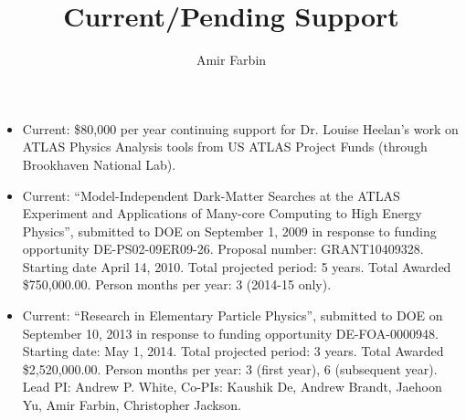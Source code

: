 \documentclass[11pt]{article}
\title{\bf Current/Pending Support} \author{Amir Farbin}
\date{\vspace{-5ex}}
\begin{document}
\maketitle
\begin{itemize}
\item Current: \$80,000 per year continuing support for Dr. Louise Heelan's work on ATLAS Physics Analysis tools from US ATLAS Project Funds (through Brookhaven National Lab).

\item Current: ``Model-Independent Dark-Matter Searches at the ATLAS
  Experiment and Applications of Many-core Computing to High Energy
  Physics'', submitted to DOE on September 1, 2009 in response to
  funding opportunity DE-PS02-09ER09-26. Proposal number:
  GRANT10409328. Starting date April 14, 2010. Total projected period:
  5 years.  Total Awarded \$750,000.00. Person months per year: 3
  (2014-15 only). 

\item Current: ``Research in Elementary Particle Physics'', submitted
  to DOE on September 10, 2013 in response to funding opportunity
  DE-FOA-0000948. Starting date: May 1, 2014. Total projected period:
  3 years.  Total Awarded \$2,520,000.00. Person months per year: 3
  (first year), 6 (subsequent year). Lead PI: Andrew P. White, Co-PIs:
  Kaushik De, Andrew Brandt, Jaehoon Yu, Amir Farbin, Christopher Jackson.


\end{itemize}
\end{document}
